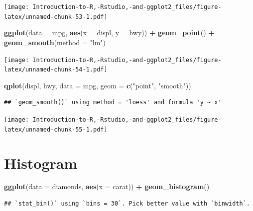 \documentclass[]{book}
\newenvironment{Shaded}{\begin{snugshade}}{\end{snugshade}}
\newcommand{\DataTypeTok}[1]{\textcolor[rgb]{0.13,0.29,0.53}{#1}}
\newcommand{\KeywordTok}[1]{\textcolor[rgb]{0.13,0.29,0.53}{\textbf{#1}}}
\newcommand{\NormalTok}[1]{#1}
\newcommand{\OperatorTok}[1]{\textcolor[rgb]{0.81,0.36,0.00}{\textbf{#1}}}
\newcommand{\StringTok}[1]{\textcolor[rgb]{0.31,0.60,0.02}{#1}}
\begin{document}
\texttt{[image: Introduction-to-R,-Rstudio,-and-ggplot2\_files/figure-latex/unnamed-chunk-53-1.pdf]}

\begin{Shaded}
\begin{Highlighting}[]
\KeywordTok{ggplot}\NormalTok{(}\DataTypeTok{data =}\NormalTok{ mpg, }\KeywordTok{aes}\NormalTok{(}\DataTypeTok{x =}\NormalTok{ displ, }\DataTypeTok{y =}\NormalTok{ hwy)) }\OperatorTok{+}\StringTok{ }\KeywordTok{geom_point}\NormalTok{() }\OperatorTok{+}\StringTok{ }\KeywordTok{geom_smooth}\NormalTok{(}\DataTypeTok{method =} \StringTok{"lm"}\NormalTok{)}
\end{Highlighting}
\end{Shaded}

\texttt{[image: Introduction-to-R,-Rstudio,-and-ggplot2\_files/figure-latex/unnamed-chunk-54-1.pdf]}

\begin{Shaded}
\begin{Highlighting}[]
\KeywordTok{qplot}\NormalTok{(displ, hwy, }\DataTypeTok{data =}\NormalTok{ mpg, }\DataTypeTok{geom =} \KeywordTok{c}\NormalTok{(}\StringTok{"point"}\NormalTok{, }\StringTok{"smooth"}\NormalTok{)) }
\end{Highlighting}
\end{Shaded}

\begin{verbatim}
## `geom_smooth()` using method = 'loess' and formula 'y ~ x'
\end{verbatim}

\texttt{[image: Introduction-to-R,-Rstudio,-and-ggplot2\_files/figure-latex/unnamed-chunk-55-1.pdf]}

\hypertarget{histogram}{%
\section{Histogram}\label{histogram}}

\begin{Shaded}
\begin{Highlighting}[]
\KeywordTok{ggplot}\NormalTok{(}\DataTypeTok{data =}\NormalTok{ diamonds, }\KeywordTok{aes}\NormalTok{(}\DataTypeTok{x =}\NormalTok{ carat)) }\OperatorTok{+}\StringTok{ }\KeywordTok{geom_histogram}\NormalTok{()}
\end{Highlighting}
\end{Shaded}

\begin{verbatim}
## `stat_bin()` using `bins = 30`. Pick better value with `binwidth`.
\end{verbatim}
\end{document}
